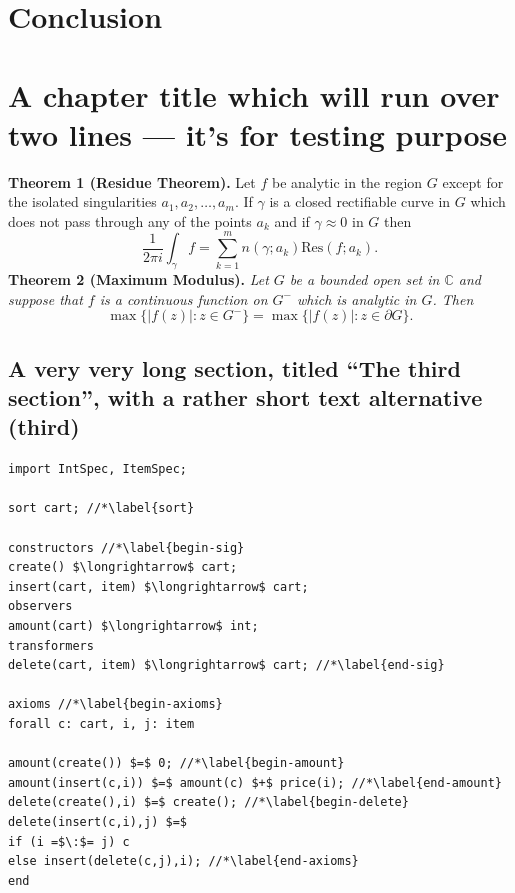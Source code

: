 \documentclass[12pt,mscthesis]{usiinfthesis}
\begin{document}
\chapter{Conclusion}

\chapter[Short title]{A chapter title which will run over two lines --- it's for
  testing purpose}


\textbf{Theorem 1 (Residue Theorem).}
Let $f$ be analytic in the region $G$ except for the isolated singularities $a_1,a_2,\ldots,a_m$. If $\gamma$ is a closed rectifiable curve in $G$ which does not pass through any of the points $a_k$ and if $\gamma\approx 0$ in $G$ then
\[
\frac{1}{2\pi i}\int_\gamma f = \sum_{k=1}^m n(\gamma;a_k) \text{Res}(f;a_k).
\]
\textbf{Theorem 2 (Maximum Modulus).}
\emph{Let $G$ be a bounded open set in $\mathbb{C}$ and suppose that $f$ is a continuous function on $G^-$ which is analytic in $G$. Then}
\[
\max\{|f(z)|:z\in G^-\}=\max \{|f(z)|:z\in \partial G \}.
\]

\section[third]{A very very long section, titled ``The third section'', with
  a rather  short text alternative (third)}

\begin{lstlisting}
import IntSpec, ItemSpec;

sort cart; //*\label{sort}

constructors //*\label{begin-sig}
create() $\longrightarrow$ cart;
insert(cart, item) $\longrightarrow$ cart;
observers
amount(cart) $\longrightarrow$ int;
transformers
delete(cart, item) $\longrightarrow$ cart; //*\label{end-sig}

axioms //*\label{begin-axioms}
forall c: cart, i, j: item 

amount(create()) $=$ 0; //*\label{begin-amount}
amount(insert(c,i)) $=$ amount(c) $+$ price(i); //*\label{end-amount}
delete(create(),i) $=$ create(); //*\label{begin-delete}
delete(insert(c,i),j) $=$
if (i =$\:$= j) c
else insert(delete(c,j),i); //*\label{end-axioms}
end
\end{lstlisting}


\nocite{*}
\end{document}
